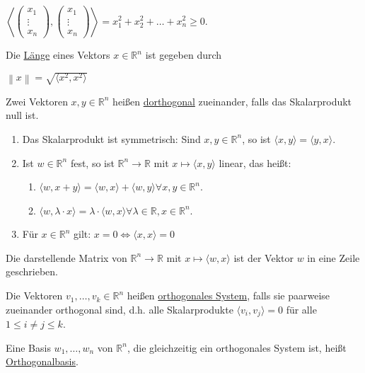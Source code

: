 \documentclass{mg2}
\begin{document}
\begin{beobachtung}
$\left\langle \begin{pmatrix}x_1\\\vdots\\x_n\end{pmatrix},\begin{pmatrix}x_1\\\vdots\\x_n\end{pmatrix} \right\rangle = x_1^2 + x_2^2 + \dots + x_n^2 \geq 0$.
\end{beobachtung}

\begin{definition}
Die \underline{Länge} eines Vektors $x \in \mathbb{R}^n$ ist gegeben durch

$\left\| x \right\| = \sqrt{\langle x^2,x^2 \rangle}$
\end{definition}

\begin{definition}[Orthogonalität]
Zwei Vektoren $x,y \in \mathbb{R}^n$ heißen \underline{dorthogonal} zueinander, falls das Skalarprodukt null ist.
\end{definition}

\begin{satz}
\begin{enumerate}
\item Das Skalarprodukt ist symmetrisch: Sind $x,y \in \mathbb{R}^n$, so ist $\langle x,y \rangle = \langle y,x \rangle$.
\item Ist $w \in \mathbb{R}^n$ fest, so ist $\mathbb{R}^n \to \mathbb{R}$ mit $x \mapsto \langle x,y \rangle$ linear, das heißt:
\begin{enumerate}
\item $\langle w, x+y \rangle = \langle w,x \rangle + \langle w,y \rangle \forall x,y \in \mathbb{R}^n$.
\item $\langle w, \lambda \cdot x \rangle = \lambda \cdot \langle w,x \rangle \forall \lambda \in \mathbb{R}, x \in \mathbb{R}^n$.
\end{enumerate}
\item Für $ x \in \mathbb{R}^n$ gilt: $x = 0 \Leftrightarrow \langle x,x \rangle = 0$
\end{enumerate}
\end{satz}
Die darstellende Matrix von $\mathbb{R}^n \to \mathbb{R}$ mit $x \mapsto \langle w,x \rangle$ ist der Vektor $w$ in eine Zeile geschrieben.

\begin{definition}
Die Vektoren $v_1, \dots, v_k \in \mathbb{R}^n$ heißen \underline{orthogonales System}, falls sie paarweise zueinander orthogonal sind, d.h. alle Skalarprodukte $\langle v_i,v_j \rangle = 0$ für alle $1 \leq i \neq j \leq k$.

Eine Basis $w_1,\dots,w_n$ von $\mathbb{R}^n$, die gleichzeitig ein orthogonales System ist, heißt \underline{Orthogonalbasis}.
\end{definition}
\end{document}
